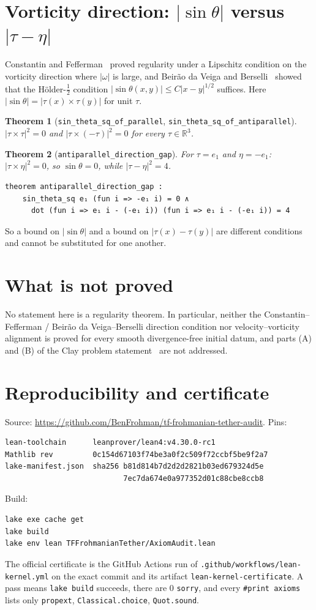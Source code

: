 \documentclass[11pt]{article}
\newtheorem{theorem}{Theorem}
\theoremstyle{definition}
\theoremstyle{remark}
\newcommand{\lean}[1]{\texttt{\upshape #1}}
\newcommand{\R}{\mathbb{R}}
\begin{document}
\section{Vorticity direction: $|\sin\theta|$ versus $|\tau-\eta|$}
Constantin and Fefferman~\cite{CF93} proved regularity under a Lipschitz
condition on the vorticity direction where $|\omega|$ is large, and
Beirão da Veiga and Berselli~\cite{BVB02} showed that the Hölder-$\tfrac12$
condition $|\sin\theta(x,y)|\le C|x-y|^{1/2}$ suffices. Here
$|\sin\theta|=|\tau(x)\times\tau(y)|$ for unit $\tau$.
\begin{theorem}[\lean{sin_theta_sq_of_parallel}, \lean{sin_theta_sq_of_antiparallel}]
$|\tau\times\tau|^2=0$ and $|\tau\times(-\tau)|^2=0$ for every $\tau\in\R^3$.
\end{theorem}
\begin{theorem}[\lean{antiparallel_direction_gap}]
For $\tau=e_1$ and $\eta=-e_1$: $|\tau\times\eta|^2=0$, so $\sin\theta=0$,
while $|\tau-\eta|^2=4$.
\begin{Verbatim}[fontsize=\small]
theorem antiparallel_direction_gap :
    sin_theta_sq e₁ (fun i => -e₁ i) = 0 ∧
      dot (fun i => e₁ i - (-e₁ i)) (fun i => e₁ i - (-e₁ i)) = 4
\end{Verbatim}
\end{theorem}
So a bound on $|\sin\theta|$ and a bound on $|\tau(x)-\tau(y)|$ are different
conditions and cannot be substituted for one another.

\section{What is not proved}
No statement here is a regularity theorem. In particular, neither the
Constantin--Fefferman / Beirão da Veiga--Berselli direction condition nor
velocity--vorticity alignment is proved for every smooth divergence-free
initial datum, and parts (A) and (B) of the Clay problem
statement~\cite{Fef06} are not addressed.

\section{Reproducibility and certificate}\label{sec:cert}
Source: \url{https://github.com/BenFrohman/tf-frohmanian-tether-audit}.
Pins:
\begin{Verbatim}[fontsize=\small]
lean-toolchain      leanprover/lean4:v4.30.0-rc1
Mathlib rev         0c154d67103f74be3a0f2c509f72ccbf5be9f2a7
lake-manifest.json  sha256 b81d814b7d2d2d2821b03ed679324d5e
                           7ec7da674e0a977352d01c88cbe8ccb8
\end{Verbatim}
Build:
\begin{Verbatim}[fontsize=\small]
lake exe cache get
lake build
lake env lean TFFrohmanianTether/AxiomAudit.lean
\end{Verbatim}
The official certificate is the GitHub Actions run of
\texttt{.github/workflows/lean-kernel.yml} on the exact commit and its artifact
\texttt{lean-kernel-certificate}. A pass means \texttt{lake build} succeeds,
there are 0 \texttt{sorry}, and every \texttt{\#print axioms} lists only
\texttt{propext}, \texttt{Classical.choice}, \texttt{Quot.sound}.
\end{document}
